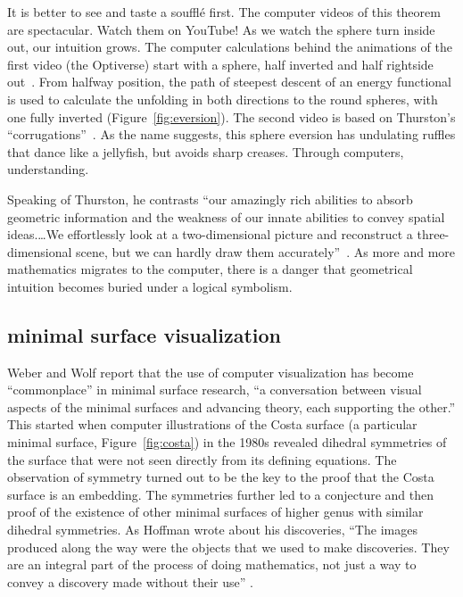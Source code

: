 \documentclass{llncs}
\begin{document}

It is better to see and taste a souffl\'e first.  The computer videos
of this theorem are spectacular.  Watch them on YouTube!  As we watch
the sphere turn inside out, our intuition grows.  The computer
calculations behind the animations of the first video (the Optiverse)
start with a sphere, half inverted and half rightside out~\cite{SFL}.  From
halfway position, the path of steepest descent of an energy functional is
used to calculate the unfolding in both directions to the round spheres,
with one fully inverted (Figure~\ref{fig:eversion}).  The second video is based on Thurston's
``corrugations''~\cite{LMM}. As the name suggests, this sphere eversion has
undulating ruffles that dance like a jellyfish, but avoids sharp
creases.   Through computers, understanding.

Speaking of Thurston, he contrasts ``our amazingly rich abilities to absorb
geometric information and the weakness of our innate abilities to convey
spatial ideas.\ldots  We effortlessly look at a two-dimensional picture
and reconstruct a three-dimensional scene, but we can hardly draw them
accurately''~\cite{Pi11}.  As more and more mathematics migrates to the computer,
there is a danger that geometrical intuition becomes buried under a logical
symbolism.

\subsection{minimal surface visualization} %

Weber and Wolf \cite{WW11} report that the use of computer
visualization has become ``commonplace'' in minimal surface research,
``a conversation between visual aspects of the minimal surfaces and
advancing theory, each supporting the other.''  This started when
computer illustrations of the Costa surface (a particular minimal
surface, Figure~\ref{fig:costa}) in the 1980s revealed dihedral symmetries of the surface that
were not seen directly from its defining equations.  The observation
of symmetry turned out to be the key to the proof that the Costa
surface is an embedding.  The symmetries further led to a conjecture
and then proof of the existence of other minimal surfaces of higher
genus with similar dihedral symmetries.  As Hoffman wrote about his discoveries, ``The
images produced along the way were the objects that we used to make
discoveries. They are an integral part of the process of doing
mathematics, not just a way to convey a discovery made without their
use'' \cite{Hoffman}.
\end{document}
